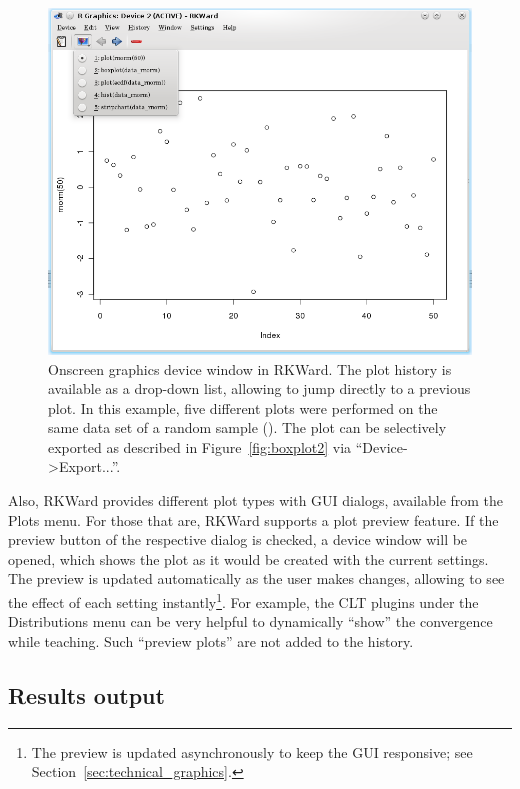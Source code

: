 \begin{figure}[htp]
 \centering
 \includegraphics{../figures/plot_history_cropped.png}
 \caption{Onscreen graphics device window in RKWard. The plot history is 
  available as a drop-down list, allowing to jump directly to a previous 
  plot. In this example, five different plots were performed on the same data 
  set of a random sample (). The plot can be 
  selectively exported as described in Figure~\ref{fig:boxplot2} via ``Device->Export...''.
}
 \label{fig:plot_history}
\end{figure}

Also, RKWard provides different plot types with GUI dialogs,
available from the Plots menu. For those that are, RKWard supports a plot
preview feature. If the preview button of
the respective dialog is checked, a device window will be opened, which
shows the plot as it would be created with the current settings. The
preview is updated automatically as the user makes changes, allowing to
see the effect of each setting instantly\footnote{The preview is
updated asynchronously to keep the GUI responsive; see Section~\ref{sec:technical_graphics}.}. For example, the CLT plugins
under the Distributions menu can be very helpful to dynamically ``show''
the convergence while teaching. Such ``preview plots'' are not added to
the history.


\subsection{Results output}
\label{sec:results_output}

